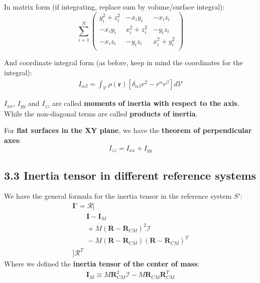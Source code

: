 \documentclass[a4paper,landscape,10pt]{cheatsheet}
\begin{document}
In matrix form (if integrating, replace sum by volume/surface integral):
$$
  \sum_{i=1}^{N}
  \begin{pmatrix*}
    y_i^2 + z_i^2 & -x_i y_i & -x_i z_i \\
    -x_i y_i & x_i^2 + z_i^2 & -y_i z_i \\
    -x_i z_i & -y_i z_i & x_i^2 + y_i^2 \\
  \end{pmatrix*}
$$

And coordinate integral form (as before, keep in mind the coordinates for the integral):
\begin{gather*}
  I_{\alpha\beta} = \int_{\mathcal{V}}\rho(\textbf{r})[\delta_{\alpha\beta}r^2-r^\alpha r^\beta]d\mathcal{V}
\end{gather*}

$I_{xx}$, $I_{yy}$ and $I_{zz}$ are called \textbf{moments of inertia with respect to the axis}. While the non-diagonal
terms are called \textbf{products of inertia}.

For \textbf{flat surfaces in the XY plane}, we have the \textbf{theorem of perpendicular axes}:
$$
  I_{zz} = I_{xx} + I_{yy}
$$



\subsection*{3.3 Inertia tensor in different reference systems}
We have the general formula for the inertia tensor in the reference system $S'$:
\begin{gather*}
  \textbf{I}' = \mathcal{R}[ \\
    \qquad \textbf{I} - \textbf{I}_M \\
    \qquad + M(\textbf{R}-\textbf{R}_{CM})^2\mathcal{I} \\
    \qquad - M(\textbf{R}-\textbf{R}_{CM})(\textbf{R}-\textbf{R}_{CM})^T \\
  ]\mathcal{R}^T
\end{gather*}
Where we defined the \textbf{inertia tensor of the center of mass}:
\begin{gather*}
  \textbf{I}_M \equiv M\textbf{R}_{CM}^2\mathcal{I} - M\textbf{R}_{CM}\textbf{R}_{CM}^T
\end{gather*}
\end{document}
